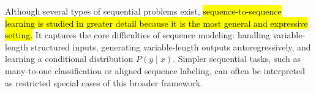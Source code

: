 \highspace
Although several types of sequential problems exist, \hl{sequence-to-sequence learning is studied in greater detail because it is the most general and expressive setting.} It captures the core difficulties of sequence modeling: handling variable-length structured inputs, generating variable-length outputs autoregressively, and learning a conditional distribution $P\left(y \mid x\right)$. Simpler sequential tasks, such as many-to-one classification or aligned sequence labeling, can often be interpreted as restricted special cases of this broader framework.